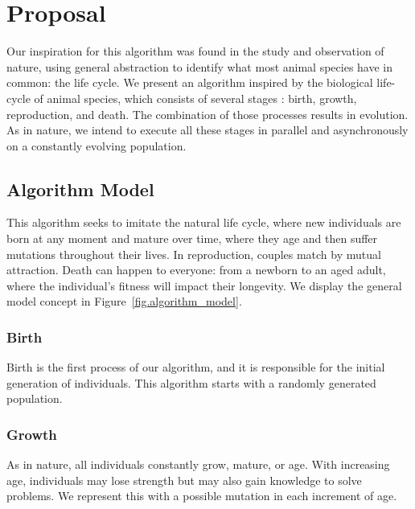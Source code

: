 \documentclass[graybox]{svmult}
\begin{document}
\section{Proposal}
    \label{section.proposal}

    Our inspiration for this algorithm was found in the study and observation of
    nature, using general abstraction to identify what most animal species have in
    common: the life cycle. We present an algorithm inspired by the biological
    life-cycle of animal species, which consists of several stages
    \cite{read1968system}: birth, growth, reproduction, and death. The combination
    of those processes results in evolution. As in nature, we intend to execute all
    these stages in parallel and asynchronously on a constantly evolving
    population.

    \subsection{Algorithm Model}

        This algorithm seeks to imitate the natural life cycle, where new individuals
        are born at any moment and mature over time, where they age and then suffer
        mutations throughout their lives. In reproduction, couples match by mutual
        attraction. Death can happen to everyone: from a newborn to an aged adult,
        where the individual's fitness will impact their longevity. We display the
        general model concept in Figure~\ref{fig.algorithm_model}.

        \subsubsection{Birth} Birth is the first process of our algorithm, and it is
        responsible for the initial generation of individuals. This algorithm starts
        with a randomly generated population.

        \subsubsection{Growth} As in nature, all individuals constantly grow, mature,
        or age. With increasing age, individuals may lose strength but may also gain
        knowledge to solve problems. We represent this with a possible mutation in each
        increment of age.
\end{document}
